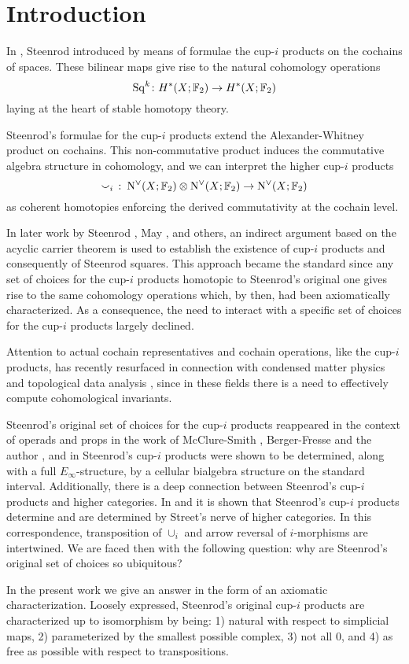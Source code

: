 
\section{Introduction} \label{s:introduction}

In \cite{steenrod1947products}, Steenrod introduced by means of formulae the cup-$i$ products on the cochains of spaces.
These bilinear maps give rise to the natural cohomology operations
\[
\mathrm{Sq}^k \colon H^*(X; {\mathbb{F}_2}) \to H^{*}(X; {\mathbb{F}_2})
\]
laying at the heart of stable homotopy theory.

Steenrod's formulae for the cup-$i$ products extend the Alexander-Whitney product on cochains.
This non-commutative product induces the commutative algebra structure in cohomology, and we can interpret the higher cup-$i$ products
\[
\smallsmile_i\ \colon \operatorname{N^{\vee}}(X; {\mathbb{F}_2}) \otimes \operatorname{N^{\vee}}(X; {\mathbb{F}_2}) \to \operatorname{N^{\vee}}(X; {\mathbb{F}_2})
\]
as coherent homotopies enforcing the derived commutativity at the cochain level.

In later work by Steenrod \cite{steenrod1962cohomology}, May \cite{may1970general}, and others, an indirect argument based on the acyclic carrier theorem is used to establish the existence of cup-$i$ products and consequently of Steenrod squares.
This approach became the standard since any set of choices for the cup-$i$ products homotopic to Steenrod's original one gives rise to the same cohomology operations which, by then, had been axiomatically characterized.
As a consequence, the need to interact with a specific set of choices for the cup-$i$ products largely declined.

Attention to actual cochain representatives and cochain operations, like the \mbox{cup-$i$} products, has recently resurfaced in connection with condensed matter physics \cite{} and topological data analysis \cite{}, since in these fields there is a need to effectively compute cohomological invariants.

Steenrod's original set of choices for the cup-$i$ products reappeared in the context of operads and props in the work of McClure-Smith \cite{mcclure2003multivariable}, Berger-Fresse \cite{berger2004combinatorial} and the author \cite{medina2020prop1}, and in \cite{medina2018prop2} Steenrod's cup-$i$ products were shown to be determined, along with a full $E_\infty$-structure, by a cellular bialgebra structure on the standard interval.
Additionally, there is a deep connection between Steenrod's cup-$i$ products and higher categories.
In \cite{medina2020globular} and \cite{bibid} it is shown that Steenrod's cup-$i$ products determine and are determined by Street's nerve of higher categories.
In this correspondence, transposition of $\cup_i$ and arrow reversal of $i$-morphisms are intertwined.
We are faced then with the following question: why are Steenrod's original set of choices so ubiquitous?

In the present work we give an answer in the form of an axiomatic characterization.
Loosely expressed, Steenrod's original cup-$i$ products are characterized up to isomorphism by being: 1) natural with respect to simplicial maps, 2) parameterized by the smallest possible complex, 3) not all $0$, and 4) as free as possible with respect to transpositions.